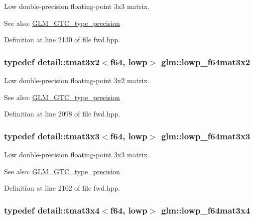 Low double-precision floating-point 3x3 matrix. \begin{Desc}
\item[See also:]\hyperlink{group__gtc__type__precision}{GLM\_\-GTC\_\-type\_\-precision} \end{Desc}


Definition at line 2130 of file fwd.hpp.\hypertarget{group__gtc__type__precision_g99f6455a37a4c407a26981561184c76d}{
\subsubsection[lowp\_\-f64mat3x2]{\setlength{\rightskip}{0pt plus 5cm}typedef detail::tmat3x2$<$f64, lowp$>$ {\bf glm::lowp\_\-f64mat3x2}}}
\label{group__gtc__type__precision_g99f6455a37a4c407a26981561184c76d}


Low double-precision floating-point 3x2 matrix. \begin{Desc}
\item[See also:]\hyperlink{group__gtc__type__precision}{GLM\_\-GTC\_\-type\_\-precision} \end{Desc}


Definition at line 2098 of file fwd.hpp.\hypertarget{group__gtc__type__precision_g3b636bef3048da2f7935eae13e66f7b3}{
\subsubsection[lowp\_\-f64mat3x3]{\setlength{\rightskip}{0pt plus 5cm}typedef detail::tmat3x3$<$f64, lowp$>$ {\bf glm::lowp\_\-f64mat3x3}}}
\label{group__gtc__type__precision_g3b636bef3048da2f7935eae13e66f7b3}


Low double-precision floating-point 3x3 matrix. \begin{Desc}
\item[See also:]\hyperlink{group__gtc__type__precision}{GLM\_\-GTC\_\-type\_\-precision} \end{Desc}


Definition at line 2102 of file fwd.hpp.\hypertarget{group__gtc__type__precision_g988c6645dead17a842c47ec042b5369e}{
\subsubsection[lowp\_\-f64mat3x4]{\setlength{\rightskip}{0pt plus 5cm}typedef detail::tmat3x4$<$f64, lowp$>$ {\bf glm::lowp\_\-f64mat3x4}}}
\label{group__gtc__type__precision_g988c6645dead17a842c47ec042b5369e}


